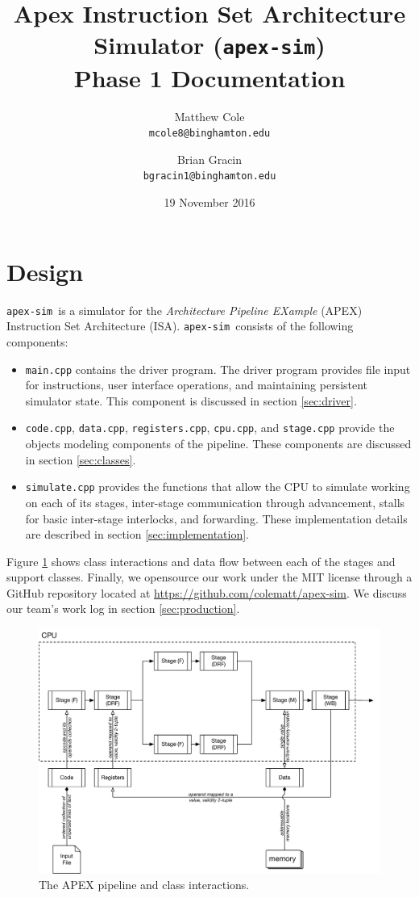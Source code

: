 \documentclass[12pt]{article}
\title{Apex Instruction Set Architecture Simulator (\texttt{apex-sim}) \\ Phase 1 Documentation}
\author{Matthew Cole \\ \texttt{mcole8@binghamton.edu}
\and
Brian Gracin \\ 
	\texttt{bgracin1@binghamton.edu}}
\date{19 November 2016}
\newcommand{\codename}[0]{\texttt{apex-sim}~}
\begin{document}
\maketitle
\tableofcontents
\listoffigures
\newpage
{}

\section{Design}
\codename is a simulator for the \textit{Architecture Pipeline EXample} (APEX) Instruction Set Architecture (ISA).
\codename consists of the following components:
\begin{itemize}
  \item \texttt{main.cpp} contains the driver program. The driver program provides file input for instructions, user interface operations, and maintaining persistent simulator state. This component is discussed in section \ref{sec:driver}.
  \item \texttt{code.cpp}, \texttt{data.cpp}, \texttt{registers.cpp}, \texttt{cpu.cpp}, and \texttt{stage.cpp} provide the objects modeling components of the pipeline. These components are discussed in section \ref{sec:classes}.
  \item \texttt{simulate.cpp} provides the functions that allow the CPU to simulate working on each of its stages, inter-stage communication through advancement, stalls for basic inter-stage interlocks, and forwarding. These implementation details are described in section \ref{sec:implementation}.
\end{itemize}
Figure \ref{fig:overview} shows class interactions and data flow between each of the stages and support classes.
Finally, we opensource our work under the MIT license through a GitHub repository located at \url{https://github.com/colematt/apex-sim}. We discuss our team's work log in section \ref{sec:production}.

\begin{figure}
  \includegraphics[width=\linewidth]{./figs/apex-sim-overview.pdf}
  \caption{The APEX pipeline and class interactions.}
  \label{fig:overview}
\end{figure}
\end{document}
